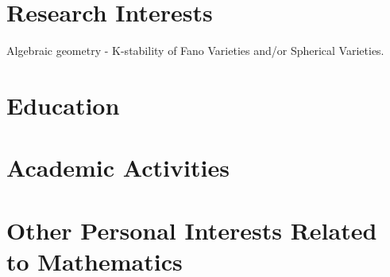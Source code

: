\documentclass[a4paper, 11pt]{article}
\begin{document}


\section{Research Interests}
Algebraic geometry - K-stability of Fano Varieties and/or Spherical Varieties.


\section{Education}


% 

\section{Academic Activities}


\section{Other Personal Interests Related to Mathematics}


% 
\end{document}
